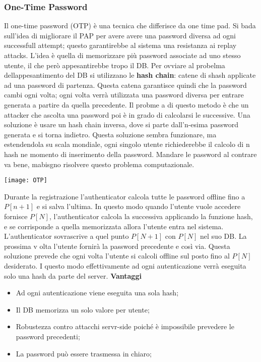\documentclass{article}
\theoremstyle{remark}
\begin{document}
\subsubsection{One-Time Password}
Il one-time password (OTP) è una tecnica che differisce da one time pad. Si bada sull'idea di migliorare il PAP per avere avere una password diversa ad ogni successfull attempt; questo garantirebbe al sistema una resistanza ai replay attacks. L'idea è quella di memorizzare più password associate ad uno stesso utente, il che però appesantirebbe tropo il DB.
Per ovviare al probelma dellappesantimento del DB si utilizzano le \textbf{hash chain}: catene di shash applicate ad una password di partenza. Questa catena garantisce quindi che la password cambi ogni volta; ogni volta verrà utilizzata una password diversa per entrare generata a partire da quella precedente. Il probme a di questo metodo è che un attacker che ascolta una password poi è in grado di calcolarsi le successive. Una soluzione è usare un hash chain inversa, dove si parte dall'n-esima password generata e si torna indietro. Questa soluzione sembra funzionare, ma estendendola su scala mondiale, ogni singolo utente richiederebbe il calcolo di n hash ne momento di inserimento della password.\newline
Mandare le password al contrare va bene, mabisgno risolvere questo problema computazionale.\newline
\begin{center}
	\texttt{[image: OTP]}
\end{center}
Durante la registrazione l'authenticator calcola tutte le password offline fino a $P[n+1]$ e si salva l'ultima. In questo modo quando l'utente vuole accedere fornisce $P[N]$, l'authenticator calcola la successiva applicando la funzione hash, e se corrisponde a quella memorizzata allora l'utente entra nel sistema. L'authenticator sovrascrive a quel punto $P[N+1]$ con $P[N]$ nel suo DB. La prossima v olta l'utente fornirà la password precedente e così via.\newline
Questa soluzione prevede che ogni volta l'utente si calcoli offline sul posto fino al $P[N]$ desiderato. I questo modo effettivamente ad ogni autenticazione verrà eseguita solo una hash da parte del server.
\textbf{Vantaggi}
\begin{itemize}
	\item Ad ogni autenticazione viene eseguita una sola hash;
	\item Il DB memorizza un solo valore per utente;
	\item Robustezza contro attacchi servr-side poiché è impossibile prevedere le password precedenti;
	\item La password può essere trasmessa in chiaro;
\end{itemize}
\end{document}
